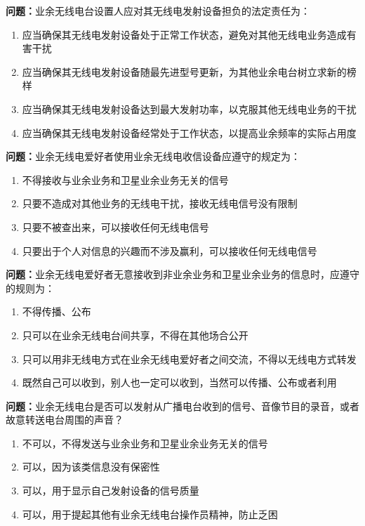 \textbf{问题：}业余无线电台设置人应对其无线电发射设备担负的法定责任为：
\begin{enumerate}[label=\Alph*), leftmargin=1cm]
	\item 应当确保其无线电发射设备处于正常工作状态，避免对其他无线电业务造成有害干扰
	\item 应当确保其无线电发射设备随最先进型号更新，为其他业余电台树立求新的榜样
	\item 应当确保其无线电发射设备达到最大发射功率，以克服其他无线电业务的干扰
	\item 应当确保其无线电发射设备经常处于工作状态，以提高业余频率的实际占用度
\end{enumerate}

\textbf{问题：}业余无线电爱好者使用业余无线电收信设备应遵守的规定为：
\begin{enumerate}[label=\Alph*), leftmargin=1cm]
	\item 不得接收与业余业务和卫星业余业务无关的信号
	\item 只要不造成对其他业务的无线电干扰，接收无线电信号没有限制
	\item 只要不被查出来，可以接收任何无线电信号
	\item 只要出于个人对信息的兴趣而不涉及赢利，可以接收任何无线电信号
\end{enumerate}

\textbf{问题：}业余无线电爱好者无意接收到非业余业务和卫星业余业务的信息时，应遵守的规则为：
\begin{enumerate}[label=\Alph*), leftmargin=1cm]
	\item 不得传播、公布
	\item 只可以在业余无线电台间共享，不得在其他场合公开
	\item 只可以用非无线电方式在业余无线电爱好者之间交流，不得以无线电方式转发
	\item 既然自己可以收到，别人也一定可以收到，当然可以传播、公布或者利用
\end{enumerate}

\textbf{问题：}业余无线电台是否可以发射从广播电台收到的信号、音像节目的录音，或者故意转送电台周围的声音？
\begin{enumerate}[label=\Alph*), leftmargin=1cm]
	\item 不可以，不得发送与业余业务和卫星业余业务无关的信号
	\item 可以，因为该类信息没有保密性
	\item 可以，用于显示自己发射设备的信号质量
	\item 可以，用于提起其他有业余无线电台操作员精神，防止乏困
\end{enumerate}

